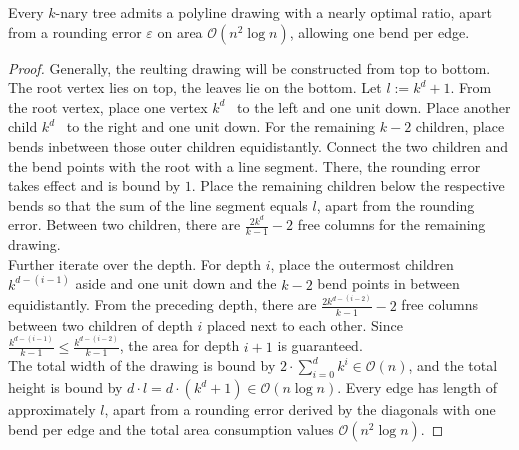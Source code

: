 \begin{theorem}
	Every $k$-nary tree admits a polyline drawing with a nearly optimal ratio, apart from a rounding error $\varepsilon$ on area $\mathcal{O}(n^2\log n)$, allowing one bend per edge.
\end{theorem}
\begin{proof}
	Generally, the reulting drawing will be constructed from top to bottom. The root vertex lies on top, the leaves lie on the bottom. Let $l := k^d +1$. From the root vertex, place one vertex $k^d $ \UL~to the left and one unit down. Place another child $k^d$ \UL~to the right and one unit down. For the remaining $k-2$ children, place bends inbetween those outer children equidistantly. Connect the two children and the bend points with the root with a line segment. There, the rounding error takes effect and is bound by $1$. Place the remaining children below the respective bends so that the sum of the line segment equals $l$, apart from the rounding error. Between two children, there are $\frac{2k^d}{k-1}-2$ free columns for the remaining drawing.\\
	Further iterate over the depth. For depth $i$, place the outermost children $k^{d-(i-1)}$ aside and one unit down and the $k-2$ bend points in between equidistantly. From the preceding depth, there are $\frac{2k^{d-(i-2)}}{k-1}-2$ free columns between two children of depth $i$ placed next to each other. Since $\frac{k^{d-(i-1)}}{k-1}\leq \frac{k^{d-(i-2)}}{k-1}$, the area for depth $i+1$ is guaranteed.\\
	The total width of the drawing is bound by $2\cdot \sum_{i=0}^{d}k^i \in \mathcal{O}(n)$, and the total height is bound by $d\cdot l = d\cdot (k^d+1) \in \mathcal{O}(n \log n)$. Every edge has length of approximately $l$, apart from a rounding error derived by the diagonals with one bend per edge and the total area consumption values $\mathcal{O}(n^2\log n)$.
\end{proof}
